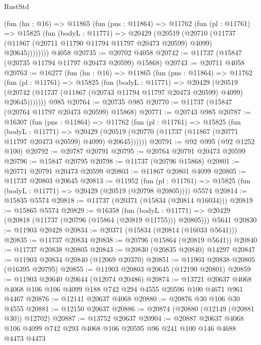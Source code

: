 \begin{lexlean}{RustStd}
\begin{coremodule}
      (fun (hn : @16) =>
      @11865
        (fun (pns : @11864) =>
        @11762
          (fun (pl : @11761) =>
          @15825
            (fun (bodyL : @11771) =>
            @20429
              (@20519
                (@20710
                  (@11737 (@11867 (@20711 @11790 @11794 @11797 @20473 @20599) @4099) @20645))))))))
    @4058
@20735 := @20702 @4058
@20742 := @11737 (@15847 (@20735 @11794 @11797 @20473 @20599) @15868)
@20743 := @20711 @4058
@20763 := @16277
    (fun (hn : @16) =>
    @11865
      (fun (pns : @11864) =>
      @11762
        (fun (pl : @11761) =>
        @15825
          (fun (bodyL : @11771) =>
          @20429
            (@20519
              (@20742 (@11737 (@11867 (@20743 @11794 @11797 @20473 @20599) @4099) @20645)))))))
    @985
@20764 := @20735 @985
@20770 := @11737 (@15847 (@20764 @11797 @20473 @20599) @15868)
@20771 := @20743 @985
@20787 := @16307
    (fun (pns : @11864) =>
    @11762
      (fun (pl : @11761) =>
      @15825
        (fun (bodyL : @11771) =>
        @20429 (@20519 (@20770 (@11737 (@11867 (@20771 @11797 @20473 @20599) @4099) @20645))))))
@20791 := @92 @995 (@92 @1252 @100)
@20792 := @20787 @20791
@20795 := @20764 @20791 @20473 @20599
@20796 := @15847 @20795
@20798 := @11737 (@20796 @15868)
@20801 := @20771 @20791 @20473 @20599
@20803 := @11867 @20801 @4099
@20805 := @11737 @20803 @20645
@20813 := @11952
    (fun (pl : @11761) => @15825 (fun (bodyL : @11771) => @20429 (@20519 (@20798 @20805))))
    @5574
@20814 := @15835 @5574
@20818 := @11737 (@20371 (@15834 (@20814 @16034)))
@20819 := @15865 @5574
@20829 := @16358
    (fun (bodyL : @11771) => @20429 (@20818 (@11737 (@20796 (@15864 (@20819 @11755))) @20805)))
    @5641
@20830 := @11903 @20428
@20834 := @20371 (@15834 (@20814 (@16033 @5641)))
@20835 := @11737 @20834
@20838 := @20796 (@15864 (@20819 @5641))
@20840 := @11737 @20838 @20805
@20843 := @20830 (@20835 @20840) @14297
@20847 := @11903 @20834 @20840 (@12069 @20370)
@20851 := @11903 @20838 @20805 (@16395 @20795)
@20855 := @11903 @20803 @20645 (@12190 @20801)
@20859 := @11903 @20640 @20644 (@12074 @20486)
@20874 := @13721
    @20637
    @4068
    @4068
    @106
    @106
    @4099
    @188
    @742
    @294
    @4555
    @20596
    @100
    @4671
    @961
    @4467
@20876 := @12141 @20637 @4068
@20880 := @20876 @30 @106 @30 @4555
@20881 := @12150 @20637
@20886 := @20874 (@20880 (@12149 (@20881 @30)) @12702)
@20887 := @13752 @20637
@20904 := @20887
    @20637
    @4068
    @106
    @4099
    @742
    @293
    @4068
    @106
    @20595
    @96
    @241
    @100
    @146
    @4688
    @4473
    @4473

\end{coremodule}
\end{lexlean}
